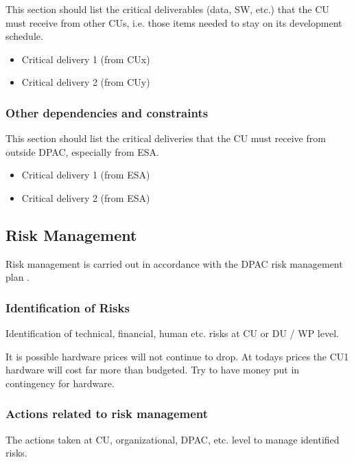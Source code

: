 \documentclass[DM,lsstdraft,SDP]{lsstdoc}
\begin{document}
This section should list the critical deliverables (data, SW, etc.) that the CU must receive from other CUs, i.e. those items needed to stay on its development schedule.
\begin{itemize}
    \item Critical delivery 1 (from CUx)
    \item Critical delivery 2 (from CUy)
\end{itemize}

\subsubsection{Other dependencies and constraints  \label{sect:othercontraints}}

This section should list the critical deliveries that the CU must receive from outside DPAC, especially from ESA.
\begin{itemize}
    \item Critical delivery 1 (from ESA)
    \item Critical delivery 2 (from ESA)
\end{itemize}

\subsection{Risk Management \label{sect:riskmngt}}
Risk management is carried out in accordance with the DPAC risk management plan .

\subsubsection{Identification of Risks \label{sect:risks}}
Identification of technical, financial, human etc. risks at CU or DU / WP
level.

{It is possible hardware prices will not continue to drop. At todays prices the
CU1 hardware will cost far more than budgeted.}
{Try to have money put in contingency for hardware.}



\subsubsection{Actions related to risk management  \label{sect:riskactions}}
The actions taken at CU, organizational, DPAC, etc. level to manage identified risks.
\end{document}
